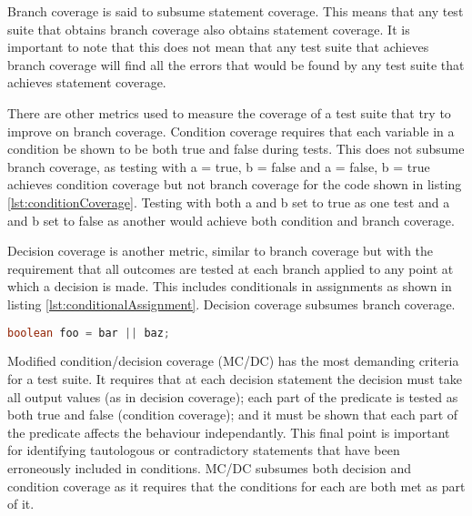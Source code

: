 \documentclass[authoryearcitations]{UoYCSproject}
\begin{document}


Branch coverage is said to subsume statement coverage. This means that any test suite that obtains branch coverage also obtains statement coverage. It is important to note that this does not mean that any test suite that achieves branch coverage will find all the errors that would be found by any test suite that achieves statement coverage.

There are other metrics used to measure the coverage of a test suite that try to improve on branch coverage. Condition coverage requires that each variable in a condition be shown to be both true and false during tests. This does not subsume branch coverage, as testing with a = true, b = false and a = false, b = true achieves condition coverage but not branch coverage for the code shown in listing \ref{lst:conditionCoverage}. Testing with both a and b set to true as one test and a and b set to false as another would achieve both condition and branch coverage.



Decision coverage is another metric, similar to branch coverage but with the requirement that all outcomes are tested at each branch applied to any point at which a decision is made. This includes conditionals in assignments as shown in listing \ref{lst:conditionalAssignment}. Decision coverage subsumes branch coverage.

\begin{lstlisting}[caption=Conditional assignments are tested by decision coverage but not branch coverage,label={lst:conditionalAssignment},language=Java,float=h]
boolean foo = bar || baz;
\end{lstlisting}

    Modified condition/decision coverage (MC/DC) has the most demanding criteria for a test suite. It requires that at each decision statement the decision must take all output values (as in decision coverage); each part of the predicate is tested as both true and false (condition coverage); and it must be shown that each part of the predicate affects the behaviour independantly. This final point is important for identifying tautologous or contradictory statements that have been erroneously included in conditions. MC/DC subsumes both decision and condition coverage as it requires that the conditions for each are both met as part of it.
\end{document}
